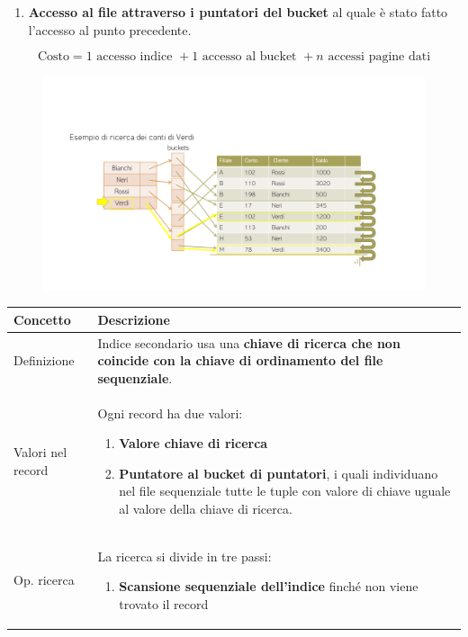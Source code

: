 \documentclass[a4paper]{article}
\begin{document}
\begin{enumerate}
\begin{enumerate}
			\item \textbf{Accesso al file attraverso i puntatori del bucket} al quale è stato fatto l'accesso al punto precedente.
		\end{enumerate}
		\begin{equation*}
			\text{Costo} = 1 \text{ accesso indice } + 1 \text{ accesso al bucket } + n \text{ accessi pagine dati}
		\end{equation*}\newpage
		
		\begin{figure}[!htp]
			\centering
			\includegraphics[width=\textwidth]{img/ex/indice-secondario-2.pdf}
		\end{figure}
		
		\begin{table}[!htp]
			\centering
			\begin{tabular}{@{} l p{23em} @{}}
				\toprule
				Concetto & Descrizione \\
				\midrule
				Definizione & Indice secondario usa una \textbf{chiave di ricerca che non coincide con la chiave di ordinamento del file sequenziale}. \\ [.7em]
				Valori nel record & Ogni record ha due valori:
				\begin{enumerate}
					\item \textbf{Valore chiave di ricerca}
					
					\item \textbf{Puntatore al bucket di puntatori}, i quali individuano nel file sequenziale tutte le tuple con valore di chiave uguale al valore della chiave di ricerca.
				\end{enumerate} \\ [.7em]
				Op. ricerca & La ricerca si divide in tre passi:
				\begin{enumerate}
					\item \textbf{Scansione sequenziale dell'indice} finché non viene trovato il record
					

\end{enumerate}
\end{tabular}
\end{table}
\end{enumerate}
\end{document}
